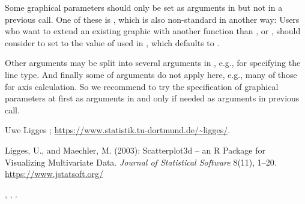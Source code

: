 \begin{Note}\relax
Some graphical parameters should only be set as arguments in
 but not in a previous  call.  One of these is
, which is also non-standard in another way: Users who
want to extend an existing  graphic with another function than
,  or , should consider to
set  to the value of  used in
, which defaults to .

Other  arguments may be split into several arguments in
, e.g., for specifying the line type.  And finally
some of  arguments do not apply here, e.g., many of those
for axis calculation.  So we recommend to try the specification of
graphical parameters at first as arguments in  and
only if needed as arguments in previous  call.
\end{Note}
\begin{Author}\relax
Uwe Ligges ;
\url{https://www.statistik.tu-dortmund.de/~ligges/}.
\end{Author}
\begin{References}\relax
Ligges, U., and Maechler, M. (2003):
Scatterplot3d -- an R Package for Visualizing Multivariate Data.
\emph{Journal of Statistical Software} 8(11), 1--20.
\url{https://www.jstatsoft.org/}
\end{References}
\begin{SeeAlso}\relax
{}, , .
\end{SeeAlso}
